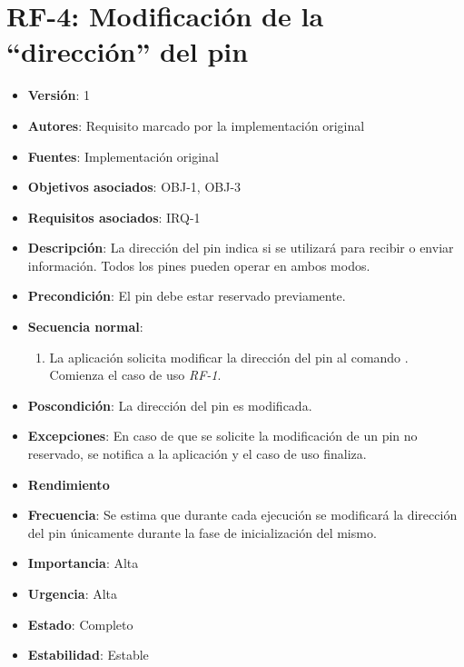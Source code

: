 \documentclass[letterpaper,10pt,spanish]{sphinxmanual}
\begin{document}
\section{RF-4: Modificación de la ``dirección'' del pin}
\label{analysis/fr:rf-4-modificacion-de-la-direccion-del-pin}\begin{itemize}
\item {} 
\textbf{Versión}: 1

\item {} 
\textbf{Autores}: Requisito marcado por la implementación original

\item {} 
\textbf{Fuentes}: Implementación original

\item {} 
\textbf{Objetivos asociados}: OBJ-1, OBJ-3

\item {} 
\textbf{Requisitos asociados}: IRQ-1

\item {} 
\textbf{Descripción}: La dirección del pin indica si se utilizará para recibir o enviar información. Todos los pines pueden operar en ambos modos.

\item {} 
\textbf{Precondición}: El pin debe estar reservado previamente.

\item {} 
\textbf{Secuencia normal}:
\begin{enumerate}
\item {} 
La aplicación solicita modificar la dirección del pin al comando . Comienza el caso de uso \emph{RF-1}.

\end{enumerate}

\item {} 
\textbf{Poscondición}: La dirección del pin es modificada.

\item {} 
\textbf{Excepciones}: En caso de que se solicite la modificación de un pin no reservado, se notifica a la aplicación y el caso de uso finaliza.

\item {} 
\textbf{Rendimiento}

\item {} 
\textbf{Frecuencia}: Se estima que durante cada ejecución se modificará la dirección del pin únicamente durante la fase de inicialización del mismo.

\item {} 
\textbf{Importancia}: Alta

\item {} 
\textbf{Urgencia}: Alta

\item {} 
\textbf{Estado}: Completo

\item {} 
\textbf{Estabilidad}: Estable

\end{itemize}
\end{document}
